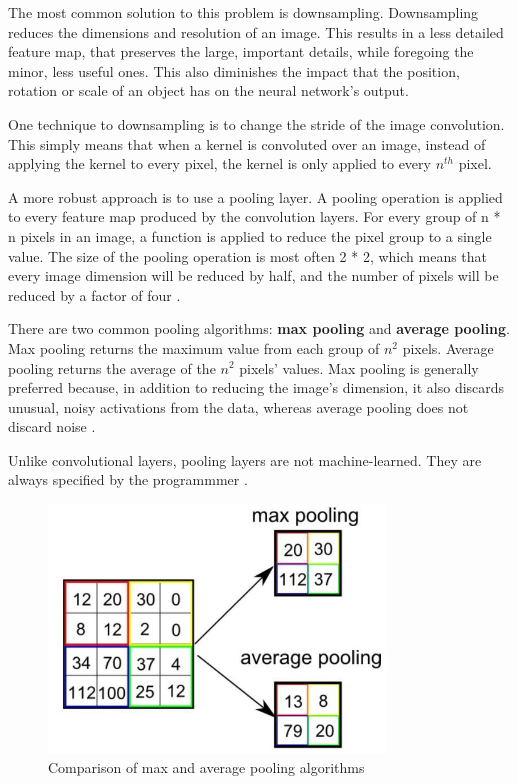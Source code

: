 \documentclass[12pt,a4paper,notitlepage]{article}
\begin{document}
The most common solution to this problem is downsampling. Downsampling reduces the dimensions and resolution of an image. This results in a less detailed feature map, that preserves the large, important details, while foregoing the minor, less useful ones. This also diminishes the impact that the position, rotation or scale of an object has on the neural network's output.

One technique to downsampling is to change the stride of the image convolution. This simply means that when a kernel is convoluted over an image, instead of applying the kernel to every pixel, the kernel is only applied to every \(n^{th}\) pixel.

A more robust approach is to use a pooling layer. A pooling operation is applied to every feature map produced by the convolution layers. For every group of n * n pixels in an image, a function is applied to reduce the pixel group to a single value. The size of the pooling operation is most often 2 * 2, which means that every image dimension will be reduced by half, and the number of pixels will be reduced by a factor of four \cite{brownlee_gentle_2019}.

There are two common pooling algorithms: \textbf{max pooling} and \textbf{average pooling}. Max pooling returns the maximum value from each group of \(n^2\) pixels. Average pooling returns the average of the \(n^2\) pixels' values. Max pooling is generally preferred because, in addition to reducing the image's dimension, it also discards unusual, noisy activations from the data, whereas average pooling does not discard noise \cite{saha_comprehensive_2018}.

Unlike convolutional layers, pooling layers are not machine-learned. They are always specified by the programmmer \cite{brownlee_gentle_2019}.

\begin{figure}[htbp]
	\centering
		\includegraphics[width=0.80\textwidth]{images/pooling.jpg}
	\caption{Comparison of max and average pooling algorithms \cite{saha_comprehensive_2018}}
	\label{fig:pooling}
\end{figure}
\end{document}
